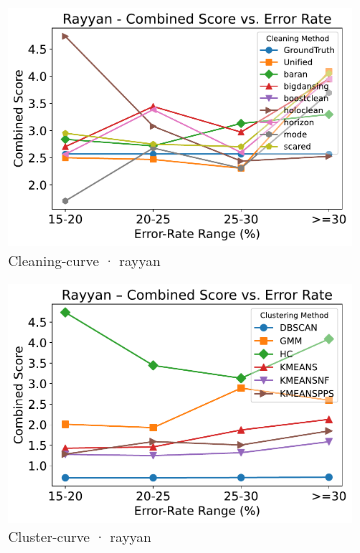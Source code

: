 \documentclass[10pt]{article} %
\numberwithin{equation}{section}
\begin{document}
\begin{figure}[htbp]
  \vspace{0.6em}
  \begin{subfigure}{0.35\linewidth}
    \centering
    \includegraphics[width=\linewidth]{figures/5.3.2graph/rayyan_combined_score_cleaning.pdf}
    \caption{Cleaning-curve · rayyan}
  \end{subfigure}\hfill
  \begin{subfigure}{0.35\linewidth}
    \centering
    \includegraphics[width=\linewidth]{figures/5.3.2graph/rayyan_combined_score_cluster.pdf}
    \caption{Cluster-curve · rayyan}
  \end{subfigure}\hfill
  \begin{subfigure}{0.295\linewidth}
    \centering

\end{subfigure}
\end{figure}
\end{document}
